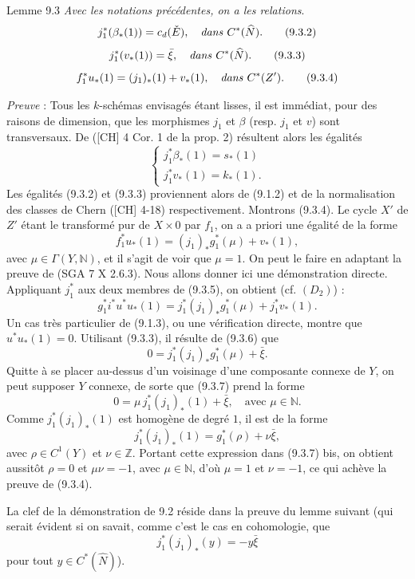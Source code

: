 \begin{statement}{Lemme 9.3}
\emph{Avec les notations précédentes, on a les relations}.
\[
j_1^*(\beta_*(1))=c_d(\check E),\quad\text{\emph{dans} }C^*(\widehat N).
\tag{9.3.2}
\]
\[
j_1^*(v_*(1))=\bar\xi,\quad\text{\emph{dans} }C^*(\widehat N).
\tag{9.3.3}
\]
\[
f_1^*u_*(1)=(j_1)_*(1)+v_*(1),\quad\text{\emph{dans} }C^*(Z').
\tag{9.3.4}
\]
\end{statement}

\emph{Preuve} : Tous les $k$-schémas envisagés étant lisses, il est immédiat, pour des raisons de dimension, que les morphismes $j_1$ et $\beta$ (resp. $j_1$ et $v$) sont transversaux. De ([CH] 4 Cor. 1 de la prop. 2) résultent alors les égalités
\[
\begin{cases}
j_1^*\beta_*(1)=s_*(1)\\
j_1^*v_*(1)=k_*(1).
\end{cases}
\]
Les égalités (9.3.2) et (9.3.3) proviennent alors de (9.1.2) et de la normalisation des classes de Chern ([CH] 4-18) respectivement. Montrons (9.3.4). Le cycle $X'$ de $Z'$ étant le transformé pur de $X\times0$ par $f_1$, on a a priori une égalité de la forme
\[
f_1^*u_*(1)=(j_1)_*g_1^*(\mu)+v_*(1),
\tag{9.3.5}
\]
avec $\mu\in\Gamma(Y,\mathbb{N})$, et il s'agit de voir que $\mu=1$. On peut le faire en adaptant la preuve de (SGA 7 X 2.6.3). Nous allons donner ici une démonstration directe. Appliquant $j_1^*$ aux deux membres de (9.3.5), on obtient (cf. $(D_2)$) :
\[
g_1^*i^*u^*u_*(1)=j_1^*(j_1)_*g_1^*(\mu)+j_1^*v_*(1).
\tag{9.3.6}
\]
Un cas très particulier de (9.1.3), ou une vérification directe, montre que $u^*u_*(1)=0$. Utilisant (9.3.3), il résulte de (9.3.6) que
\[
0=j_1^*(j_1)_*g_1^*(\mu)+\bar\xi.
\tag{9.3.7}
\]
Quitte à se placer au-dessus d'un voisinage d'une composante connexe de $Y$, on peut supposer $Y$ connexe, de sorte que (9.3.7) prend la forme
\[
0=\mu\,j_1^*(j_1)_*(1)+\bar\xi,\quad\text{avec }\mu\in\mathbb{N}.
\tag*{(9.3.7) bis}
\]
Comme $j_1^*(j_1)_*(1)$ est homogène de degré $1$, il est de la forme
\[
j_1^*(j_1)_*(1)=g_1^*(\rho)+\nu\bar\xi,
\]
avec $\rho\in C^1(Y)$ et $\nu\in\mathbb{Z}$. Portant cette expression dans (9.3.7) bis, on obtient aussitôt $\rho=0$ et $\mu\nu=-1$, avec $\mu\in\mathbb{N}$, d'où $\mu=1$ et $\nu=-1$, ce qui achève la preuve de (9.3.4).

La clef de la démonstration de 9.2 réside dans la preuve du lemme suivant (qui serait évident si on savait, comme c'est le cas en cohomologie, que
\[
j_1^*(j_1)_*(y)=-y\bar\xi
\]
pour tout $y\in C^*(\widehat N)$).


